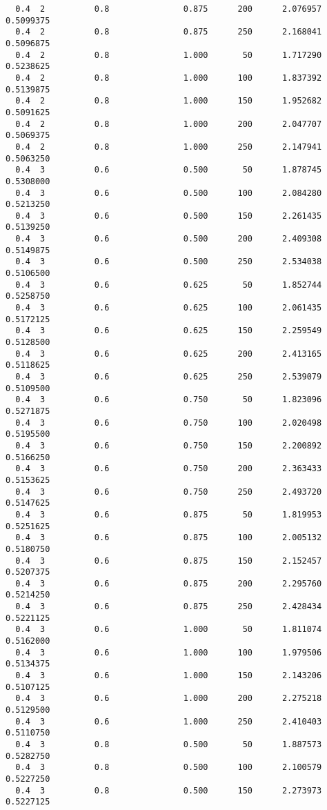 \documentclass[
  letterpaper,
  DIV=11,
  numbers=noendperiod]{scrartcl}
\begin{document}
\begin{verbatim}
  0.4  2          0.8               0.875      200      2.076957  0.5099375
  0.4  2          0.8               0.875      250      2.168041  0.5096875
  0.4  2          0.8               1.000       50      1.717290  0.5238625
  0.4  2          0.8               1.000      100      1.837392  0.5139875
  0.4  2          0.8               1.000      150      1.952682  0.5091625
  0.4  2          0.8               1.000      200      2.047707  0.5069375
  0.4  2          0.8               1.000      250      2.147941  0.5063250
  0.4  3          0.6               0.500       50      1.878745  0.5308000
  0.4  3          0.6               0.500      100      2.084280  0.5213250
  0.4  3          0.6               0.500      150      2.261435  0.5139250
  0.4  3          0.6               0.500      200      2.409308  0.5149875
  0.4  3          0.6               0.500      250      2.534038  0.5106500
  0.4  3          0.6               0.625       50      1.852744  0.5258750
  0.4  3          0.6               0.625      100      2.061435  0.5172125
  0.4  3          0.6               0.625      150      2.259549  0.5128500
  0.4  3          0.6               0.625      200      2.413165  0.5118625
  0.4  3          0.6               0.625      250      2.539079  0.5109500
  0.4  3          0.6               0.750       50      1.823096  0.5271875
  0.4  3          0.6               0.750      100      2.020498  0.5195500
  0.4  3          0.6               0.750      150      2.200892  0.5166250
  0.4  3          0.6               0.750      200      2.363433  0.5153625
  0.4  3          0.6               0.750      250      2.493720  0.5147625
  0.4  3          0.6               0.875       50      1.819953  0.5251625
  0.4  3          0.6               0.875      100      2.005132  0.5180750
  0.4  3          0.6               0.875      150      2.152457  0.5207375
  0.4  3          0.6               0.875      200      2.295760  0.5214250
  0.4  3          0.6               0.875      250      2.428434  0.5221125
  0.4  3          0.6               1.000       50      1.811074  0.5162000
  0.4  3          0.6               1.000      100      1.979506  0.5134375
  0.4  3          0.6               1.000      150      2.143206  0.5107125
  0.4  3          0.6               1.000      200      2.275218  0.5129500
  0.4  3          0.6               1.000      250      2.410403  0.5110750
  0.4  3          0.8               0.500       50      1.887573  0.5282750
  0.4  3          0.8               0.500      100      2.100579  0.5227250
  0.4  3          0.8               0.500      150      2.273973  0.5227125

\end{verbatim}
\end{document}
